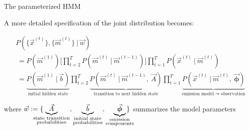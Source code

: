 \begin{frame}{The parameterized HMM}
	
A more detailed specification of the joint distribution becomes:
	
	\begin{align}
	&P(\{\vec{x}^{(t)}\}  , \{\vec{m}^{(t)}\} ~|~ \vec{w})
	 \\&
	~=P(\vec{m}^{(1)})
	\Bigg\lbrack
	\prod_{t=2}^T
	P(\vec{m}^{(t)} ~|~ \vec{m}^{(t-1)})
	\Bigg\rbrack
	\prod_{t=1}^T P(\vec{x}^{(t)} ~|~ \vec{m}^{(t)})
	\\&~=
	\underbrace{P(\vec{m}^{(1)}~|~ \vec{b})}_{\text{initial hidden state}}
	\prod_{t=2}^{T} 
		\underbrace{P(\vec{m}^{(t)}~|~  \vec{m}^{(t - 1)},~ \vec{A})
		}_{\text{transition to next hidden state}}
	\prod_{t=1}^{T} 
	\underbrace{P(\vec{x}^{(t)}~|~  \vec{m}^{(t)},~ \vec{\boldsymbol{\phi}})
	}_{\text{emission model $\leadsto$ observation}}
	\end{align}
	
	where $\vec{w} := \{ 
	\kern-3.5ex
		\underbrace{\vec{A}}_{\substack{\text{state transition} \\ \text{probabilities}}}, \underbrace{\vec{b}}_{\substack{\text{initial state} \\ \text{probabilities}}}, \underbrace{\vec{\boldsymbol{\phi}}}_{\substack{\text{emission} \\ \text{components}}} 
	\kern-2.5ex
		\}$ summarizes the model parameters
	
\end{frame}
